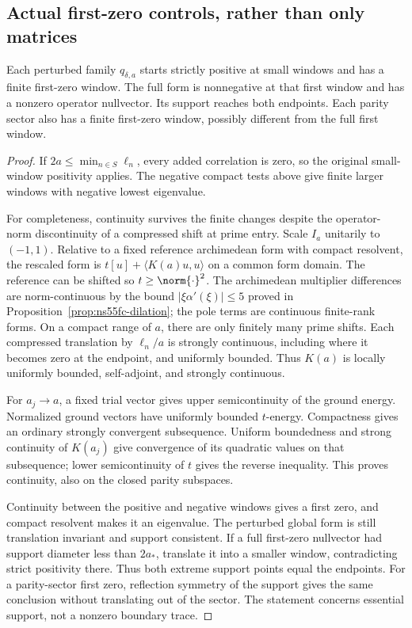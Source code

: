 \subsection*{Actual first-zero controls, rather than only matrices}
\begin{theorem}\label{thm:ns57-first-zero-controls}
Each perturbed family $q_{\delta,a}$ starts strictly positive at small
windows and has a finite first-zero window. The full form is nonnegative
at that first window and has a nonzero operator nullvector. Its support
reaches both endpoints. Each parity sector also has a finite first-zero
window, possibly different from the full first window.
\end{theorem}
\begin{proof}
If $2a\le\min_{n\in S}\ell_n$, every added correlation is zero, so the
original small-window positivity applies. The negative compact tests
above give finite larger windows with negative lowest eigenvalue.

For completeness, continuity survives the finite changes despite the
operator-norm discontinuity of a compressed shift at prime entry.
Scale $I_a$ unitarily to $(-1,1)$. Relative to a fixed reference
archimedean form with compact resolvent, the rescaled form is
$t[u]+\langle K(a)u,u\rangle$ on a common form domain.
The reference can be shifted so $t\ge\norm{\cdot}^2$.
The archimedean multiplier differences are norm-continuous by the
bound $|\xi\alpha'(\xi)|\le5$ proved in Proposition~\ref{prop:ns55fc-dilation}; the pole terms are continuous
finite-rank forms. On a compact range of $a$, there are only finitely
many prime shifts. Each compressed translation by $\ell_n/a$ is
strongly continuous, including where it becomes zero at the endpoint,
and uniformly bounded. Thus $K(a)$ is locally uniformly bounded,
self-adjoint, and strongly continuous.

For $a_j\to a$, a fixed trial vector gives upper semicontinuity of
the ground energy. Normalized ground vectors have uniformly bounded
$t$-energy. Compactness gives an ordinary strongly convergent
subsequence. Uniform boundedness and strong continuity of $K(a_j)$
give convergence of its quadratic values on that subsequence; lower
semicontinuity of $t$ gives the reverse inequality. This proves
continuity, also on the closed parity subspaces.

Continuity between the positive and negative windows gives a first
zero, and compact resolvent makes it an eigenvalue. The perturbed
global form is still translation invariant and support consistent.
If a full first-zero nullvector had support diameter less than $2a_*$,
translate it into a smaller window, contradicting strict positivity
there. Thus both extreme support points equal the endpoints.
For a parity-sector first zero, reflection symmetry of the support
gives the same conclusion without translating out of the sector.
The statement concerns essential support, not a nonzero boundary trace.
\end{proof}

